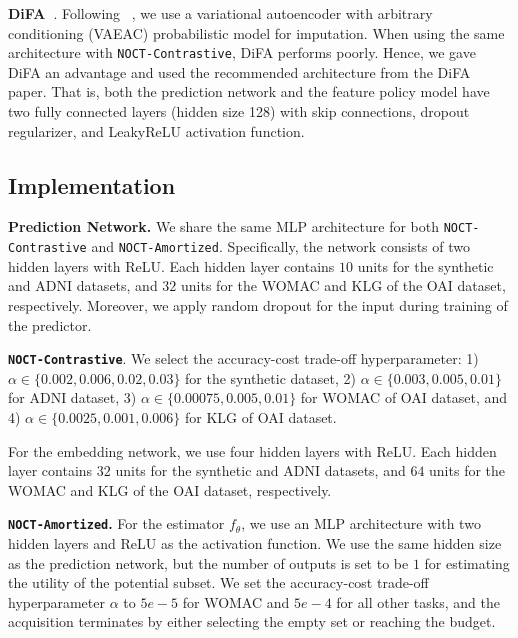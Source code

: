 \textbf{DiFA~\citep{ghosh2023difa}}. Following ~\citet{ghosh2023difa}, we use a variational autoencoder with arbitrary conditioning (VAEAC) probabilistic model  \citep{ivanov2018variational} for imputation. When using the same architecture with \texttt{NOCT-Contrastive}, DiFA performs poorly. Hence, we gave DiFA an advantage and used the recommended architecture from the DiFA paper. That is, both the prediction network and the feature policy model have two fully connected layers (hidden size 128) with skip connections, dropout regularizer, and LeakyReLU activation function. 

\subsection{\texttt{\OurMethod} Implementation} \label{sec:architecture}
\textbf{Prediction Network.} We share the same MLP architecture for both \texttt{NOCT-Contrastive} and \texttt{NOCT-Amortized}. Specifically, the network consists of two hidden layers with ReLU. Each hidden layer contains $10$ units for the synthetic and ADNI datasets, and $32$ units for the WOMAC and KLG of the OAI dataset, respectively. Moreover, we apply random dropout for the input during training of the predictor.

\textbf{\texttt{NOCT-Contrastive}}. We select the accuracy-cost trade-off hyperparameter: 1) $\alpha \in \{0.002, 0.006, 0.02, 0.03\}$ for the synthetic dataset, 2) $\alpha \in \{0.003, 0.005, 0.01 \}$ for ADNI dataset, 3) $\alpha \in \{0.00075, 0.005, 0.01 \}$ for WOMAC of OAI dataset, and 4) $\alpha \in \{0.0025, 0.001, 0.006 \}$ for KLG of OAI dataset. 

For the embedding network, we use four hidden layers with ReLU. Each hidden layer contains $32$ units for the synthetic and ADNI datasets, and $64$ units for the WOMAC and KLG of the OAI dataset, respectively.


\textbf{\texttt{NOCT-Amortized}.} For the estimator $f_\theta$, we use an MLP architecture with two hidden layers and ReLU as the activation function. We use the same hidden size as the prediction network, but the number of outputs is set to be $1$ for estimating the utility of the potential subset. We set the accuracy-cost trade-off hyperparameter $\alpha$ to $5e{-}5$ for WOMAC and $5e{-}4$ for all other tasks, and the acquisition terminates by either selecting the empty set or reaching the budget.

